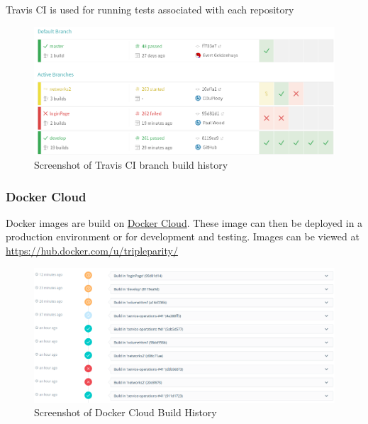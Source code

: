 \documentclass[]{article}
\begin{document}
Travis CI is used for running tests associated with each repository
\begin{figure}[H]
	\centering
	\includegraphics[scale=0.5]{travis_build_history.png}
	\caption{Screenshot of Travis CI branch build history}
\end{figure}

\subsubsection{Docker Cloud}
Docker images are build on \href{https://cloud.docker.com/}{Docker Cloud}.
These image can then be deployed in a production environment or for development and testing.
Images can be viewed at \url{https://hub.docker.com/u/tripleparity/}

\begin{figure}[H]
	\centering
	\includegraphics[scale=0.5]{docker_cloud_build_history.png}
	\caption{Screenshot of Docker Cloud Build History}
\end{figure}
\end{document}
